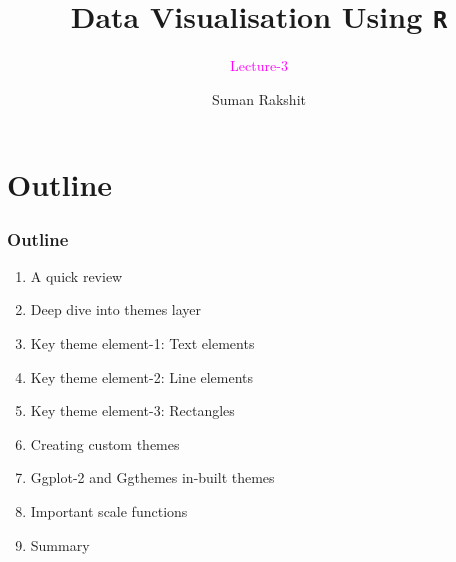 \documentclass{beamer}
\title[]{Data Visualisation Using \texttt{R}}
\subtitle{\textcolor{magenta}{Lecture-3}}
\author[]{Suman Rakshit} %
\institute[School of EECMS, Curtin University] %
{
	\textcolor{magenta}{School of EECMS, Curtin University} %
}
\begin{document}
\begin{frame}
	\titlepage %
\end{frame}







\section{Outline}
\begin{frame}[t]\frametitle{Outline}
\begin{enumerate}
\item A quick review
\item Deep dive into themes layer
\item Key theme element-1: Text elements
\item Key theme element-2: Line elements
\item Key theme element-3: Rectangles
\item Creating custom themes
\item Ggplot-2 and Ggthemes in-built themes
\item Important scale functions
\item Summary
\end{enumerate}
\end{frame}
\end{document}

